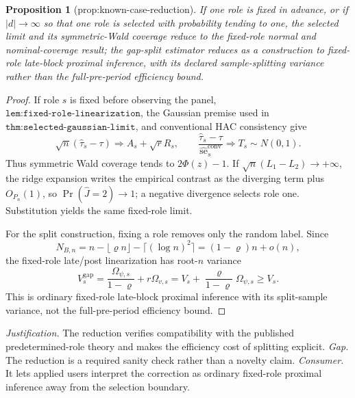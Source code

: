 \documentclass{article}
\newtheorem{proposition}{Proposition}
\begin{document}
\begin{proposition}[prop:known-case-reduction]\label{prop:known-case-reduction}
If one role is fixed in advance, or if \(|d|\to\infty\) so that one role is selected with probability tending to one, the selected limit and its symmetric-Wald coverage reduce to the fixed-role normal and nominal-coverage result; the gap-split estimator reduces as a construction to fixed-role late-block proximal inference, with its declared sample-splitting variance rather than the full-pre-period efficiency bound.
\end{proposition}
\begin{proof}
If role \(s\) is fixed before observing the panel, \(\texttt{lem:fixed-role-linearization}\), the Gaussian premise used in \(\texttt{thm:selected-gaussian-limit}\), and conventional HAC consistency give
\[
 \sqrt n(\widehat\tau_s-\tau)\Rightarrow A_s+\sqrt rR_s,
 \qquad
 \frac{\widehat\tau_s-\tau}{\widehat{\operatorname{se}}_s^{\mathrm{conv}}}
 \Rightarrow T_s\sim N(0,1).
\]
Thus symmetric Wald coverage tends to \(2\Phi(z)-1\).  If \(\sqrt n(L_1-L_2)\to+\infty\), the ridge expansion writes the empirical contrast as the diverging term plus \(O_{P_n}(1)\), so \(\Pr(\widehat J=2)\to1\); a negative divergence selects role one.  Substitution yields the same fixed-role limit.

For the split construction, fixing a role removes only the random label.  Since
\[
 N_{B,n}=n-\lfloor\varrho n\rfloor-\lceil(\log n)^2\rceil
 =(1-\varrho)n+o(n),
\]
the fixed-role late/post linearization has root-\(n\) variance
\[
 V_s^{\mathrm{gap}}=\frac{\Omega_{\psi,s}}{1-\varrho}+r\Omega_{v,s}
 =V_s+\frac{\varrho}{1-\varrho}\Omega_{\psi,s}\geq V_s.
\]
This is ordinary fixed-role late-block proximal inference with its split-sample variance, not the full-pre-period efficiency bound.
\end{proof}
\par\smallskip\noindent \textit{Justification.} The reduction verifies compatibility with the published predetermined-role theory and makes the efficiency cost of splitting explicit. \textit{Gap.} The reduction is a required sanity check rather than a novelty claim. \textit{Consumer.} It lets applied users interpret the correction as ordinary fixed-role proximal inference away from the selection boundary.
\end{document}
